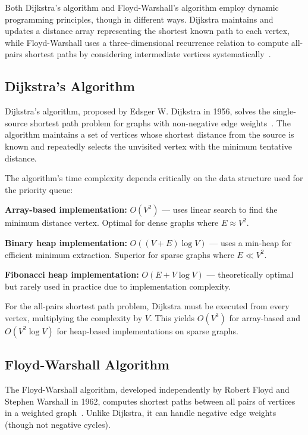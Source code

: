 \documentclass[12pt, a4paper]{report}
\begin{document}
Both Dijkstra's algorithm and Floyd-Warshall's algorithm employ dynamic programming principles, though in different ways. Dijkstra maintains and updates a distance array representing the shortest known path to each vertex, while Floyd-Warshall uses a three-dimensional recurrence relation to compute all-pairs shortest paths by considering intermediate vertices systematically~\cite{ref:cormen}.

\subsection{Dijkstra's Algorithm}

Dijkstra's algorithm, proposed by Edsger W. Dijkstra in 1956, solves the single-source shortest path problem for graphs with non-negative edge weights~\cite{ref:dijkstra}. The algorithm maintains a set of vertices whose shortest distance from the source is known and repeatedly selects the unvisited vertex with the minimum tentative distance.

The algorithm's time complexity depends critically on the data structure used for the priority queue:

\begin{dashenum}
  \item \textbf{Array-based implementation:} $O(V^2)$ — uses linear search to find the minimum distance vertex. Optimal for dense graphs where $E \approx V^2$.
  \item \textbf{Binary heap implementation:} $O((V + E) \log V)$ — uses a min-heap for efficient minimum extraction. Superior for sparse graphs where $E \ll V^2$.
  \item \textbf{Fibonacci heap implementation:} $O(E + V \log V)$ — theoretically optimal but rarely used in practice due to implementation complexity.
\end{dashenum}

For the all-pairs shortest path problem, Dijkstra must be executed from every vertex, multiplying the complexity by $V$. This yields $O(V^3)$ for array-based and $O(V^2 \log V)$ for heap-based implementations on sparse graphs.

\subsection{Floyd-Warshall Algorithm}

The Floyd-Warshall algorithm, developed independently by Robert Floyd and Stephen Warshall in 1962, computes shortest paths between all pairs of vertices in a weighted graph~\cite{ref:floyd}. Unlike Dijkstra, it can handle negative edge weights (though not negative cycles).
\end{document}
